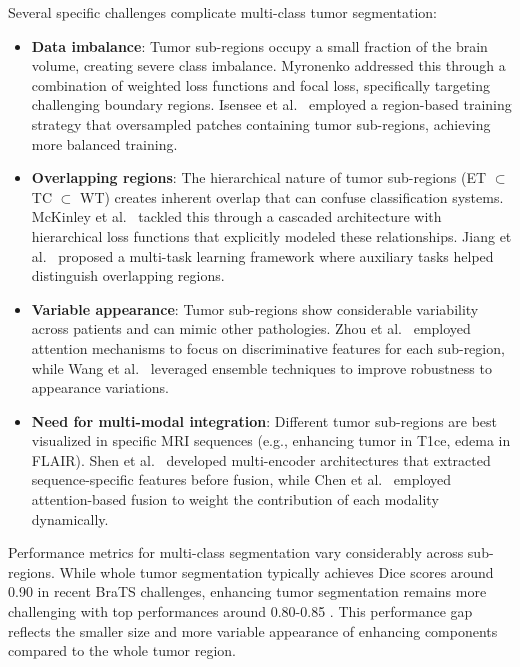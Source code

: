 Several specific challenges complicate multi-class tumor segmentation:

\begin{itemize}
  \item \textbf{Data imbalance}: Tumor sub-regions occupy a small fraction of the brain volume, creating severe class imbalance. Myronenko \cite{Myronenko2018} addressed this through a combination of weighted loss functions and focal loss, specifically targeting challenging boundary regions. Isensee et al.\ \cite{Isensee2018} employed a region-based training strategy that oversampled patches containing tumor sub-regions, achieving more balanced training.

  \item \textbf{Overlapping regions}: The hierarchical nature of tumor sub-regions (ET $\subset$ TC $\subset$ WT) creates inherent overlap that can confuse classification systems. McKinley et al.\ \cite{McKinley2019} tackled this through a cascaded architecture with hierarchical loss functions that explicitly modeled these relationships. Jiang et al.\ \cite{Jiang2020} proposed a multi-task learning framework where auxiliary tasks helped distinguish overlapping regions.

  \item \textbf{Variable appearance}: Tumor sub-regions show considerable variability across patients and can mimic other pathologies. Zhou et al.\ \cite{Zhou2020} employed attention mechanisms to focus on discriminative features for each sub-region, while Wang et al.\ \cite{Wang2019} leveraged ensemble techniques to improve robustness to appearance variations.

  \item \textbf{Need for multi-modal integration}: Different tumor sub-regions are best visualized in specific MRI sequences (e.g., enhancing tumor in T1ce, edema in FLAIR). Shen et al.\ \cite{Shen2019} developed multi-encoder architectures that extracted sequence-specific features before fusion, while Chen et al.\ \cite{Chen2019} employed attention-based fusion to weight the contribution of each modality dynamically.
\end{itemize}

Performance metrics for multi-class segmentation vary considerably across sub-regions. While whole tumor segmentation typically achieves Dice scores around 0.90 in recent BraTS challenges, enhancing tumor segmentation remains more challenging with top performances around 0.80-0.85 \cite{Bakas2020}. This performance gap reflects the smaller size and more variable appearance of enhancing components compared to the whole tumor region.

